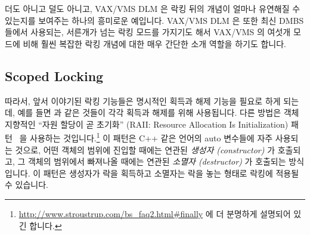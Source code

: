 더도 아니고 덜도 아니고, VAX/VMS DLM 은 락킹 뒤의 개념이 얼마나 유연해질 수
있는지를 보여주는 하나의 흥미로운 예입니다.
VAX/VMS DLM 은 또한 최신 DMBS 들에서 사용되는, 서른개가 넘는 락킹 모드를
가지기도 해서 VAX/VMS 의 여섯개 모드에 비해 훨씬 복잡한 락킹 개념에 대한 매우
간단한 소개 역할을 하기도 합니다.

\subsection{Scoped Locking}
\label{sec:locking:Scoped Locking}

따라서, 앞서 이야기된 락킹 기능들은 명시적인 획득과 해제 기능을 필요로 하게
되는데, 예를 들면  과  같은 것들이 각각
획득과 해제를 위해 사용됩니다.
다른 방법은 객체 지향적인 ``자원 할당이 곧 초기화'' (RAII: Resource Allocation
Is Initialization) 패턴~\cite{MargaretAEllis1990Cplusplus} 을 사용하는
것입니다.\footnote{
	\url{http://www.stroustrup.com/bs_faq2.html\#finally} 에 더 분명하게
	설명되어 있긴 합니다.}
이 패턴은 C++ 같은 언어의 auto 변수들에 자주 사용되는 것으로, 어떤 객체의
범위에 진입할 때에는 연관된 \emph{생성자 (constructor)} 가 호출되고, 그 객체의
범위에서 빠져나올 때에는 연관된 \emph{소멸자 (destructor)} 가 호출되는
방식입니다.
이 패턴은 생성자가 락을 획득하고 소멸자는 락을 놓는 형태로 락킹에 적용될 수
있습니다.

